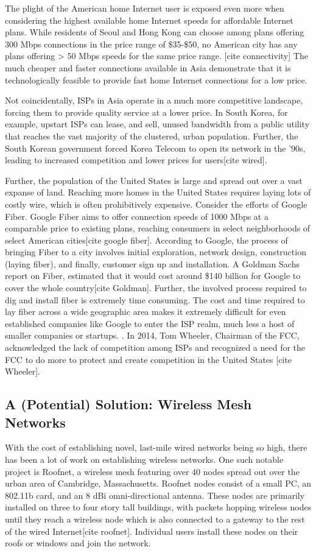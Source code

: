 \documentclass[pageno]{jpaper}
\begin{document}
The plight of the American home Internet user is exposed even more when considering the highest available home Internet speeds for affordable Internet plans. While residents of Seoul and Hong Kong can choose among plans offering 300 Mbps connections in the price range of \$35-\$50, no American city has any plans offering > 50 Mbps speeds for the same price range. [cite connectivity] The much cheaper and faster connections available in Asia demonstrate that it is technologically feasible to provide fast home Internet connections for a low price. 

Not coincidentally, ISPs in Asia operate in a much more competitive landscape, forcing them to provide quality service at a lower price. In South Korea, for example, upstart ISPs can lease, and sell, unused bandwidth from a public utility that reaches the vast majority of the clustered, urban population. Further, the South Korean government forced Korea Telecom to open its network in the '90s, leading to increased competition and lower prices for users[cite wired]. 

Further, the population of the United States is large and spread out over a vast expanse of land. Reaching more homes in the United States requires laying lots of costly wire, which is often prohibitively expensive. Consider the efforts of Google Fiber. Google Fiber aims to offer connection speeds of 1000 Mbps at a comparable price to existing plans, reaching consumers in select neighborhoods of select American cities[cite google fiber]. According to Google, the process of bringing Fiber to a city involves initial exploration, network design, construction (laying fiber), and finally, customer sign up and installation. A Goldman Sachs report on Fiber, estimated that it would cost around \$140 billion for Google to cover the whole country[cite Goldman]. Further, the involved process required to dig and install fiber is extremely time consuming. The cost and time required to lay fiber across a wide geographic area makes it extremely difficult for even established companies like Google to enter the ISP realm, much less a host of smaller companies or startups. . In 2014, Tom Wheeler, Chairman of the FCC, acknowledged the lack of competition among ISPs and recognized a need for the FCC to do more to protect and create competition in the United States [cite Wheeler].

\subsection{A (Potential) Solution: Wireless Mesh Networks}
With the cost of establishing novel, last-mile wired networks being so high, there has been a lot of work on establishing wireless networks. One such notable project is Roofnet, a wireless mesh featuring over 40 nodes spread out over the urban area of Cambridge, Massachusetts. Roofnet nodes consist of a small PC, an 802.11b card, and an 8 dBi omni-directional antenna. These nodes are primarily installed on three to four story tall buildings, with packets hopping wireless nodes until they reach a wireless node which is also connected to a gateway to the rest of the wired Internet[cite roofnet]. Individual users install these nodes on their roofs or windows and join the network. 
\end{document}
